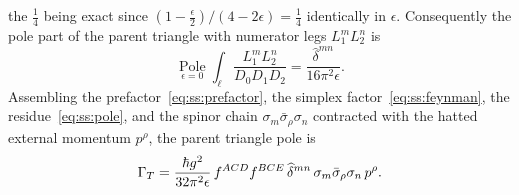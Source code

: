 the $\tfrac14$ being exact since
$(1-\tfrac{\epsilon}{2})/(4-2\epsilon)=\tfrac14$ identically in $\epsilon$.
Consequently the pole part of the parent triangle with numerator legs
$L_1^{m}L_2^{n}$ is
\begin{equation}\label{eq:ss:pole}
\operatorname*{Pole}_{\epsilon=0}
\int_{\ell}\frac{L_1^{m}L_2^{n}}{D_0D_1D_2}
=\frac{\widehat\delta^{mn}}{16\pi^{2}\epsilon} .
\end{equation}
Assembling the prefactor~\eqref{eq:ss:prefactor}, the simplex
factor~\eqref{eq:ss:feynman}, the residue~\eqref{eq:ss:pole}, and the spinor
chain $\sigma_m\bar\sigma_\rho\sigma_n$ contracted with the hatted external
momentum $p^{\rho}$, the parent triangle pole is
\begin{equation}\label{eq:ss:parentpole}
\Gamma_{T}
=\frac{\hbar g^{2}}{32\pi^{2}\epsilon}\,
f^{ACD}f^{BCE}\,\widehat\delta^{mn}\,
\sigma_m\bar\sigma_\rho\sigma_n\,p^{\rho} .
\end{equation}

